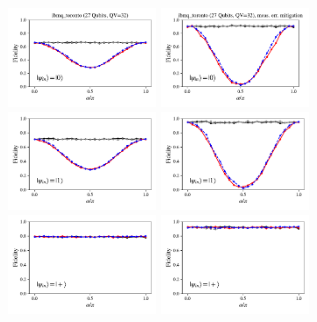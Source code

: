 \documentclass[a4paper]{article}
\begin{document}
\begin{figure}[H]
	\centering
	\includegraphics[width=0.35\textwidth]{fidelity_qc2_mit1_state0}
	\includegraphics[width=0.35\textwidth]{fidelity_qc2_mit0_state0}
	\\
	\includegraphics[width=0.35\textwidth]{fidelity_qc2_mit1_state1}
	\includegraphics[width=0.35\textwidth]{fidelity_qc2_mit0_state1}
	\\
	\includegraphics[width=0.35\textwidth]{fidelity_qc2_mit1_state2}
	\includegraphics[width=0.35\textwidth]{fidelity_qc2_mit0_state2}

\end{figure}
\end{document}
